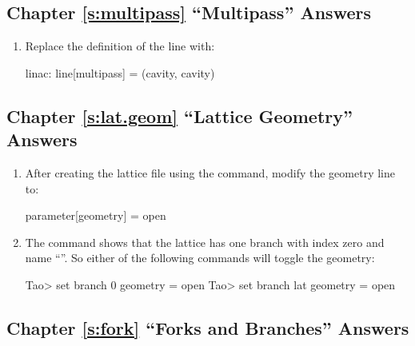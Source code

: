 \documentclass{hitec}     %
\begin{document}
\subsection[Chapter \ref*{s:multipass.ex} ``Multipass'']{Chapter \hyperref[s:multipass.ex]{\ref*{s:multipass}} ``Multipass'' Answers}
\label{s:ans.multi}

\begin{enumerate}[label=\ref*{s:multipass}.\arabic{enumi}]
\item
Replace the definition of the  line with:
\begin{code}
linac: line[multipass] = (cavity, cavity)
\end{code}
\end{enumerate}

\subsection[Chapter \ref*{s:lat.geom.ex} ``Lattice Geometry'']{Chapter \hyperref[s:lat.geom.ex]{\ref*{s:lat.geom}} ``Lattice Geometry'' Answers}
\label{s:ans.geom}

\begin{enumerate}[label=\ref*{s:lat.geom}.\arabic{enumi}]
\item
After creating the lattice file using the  command, modify the geometry line to:
\begin{code}
parameter[geometry] = open
\end{code}
%
\item
The  command shows that the lattice has one branch with index zero and name ``''. So
either of the following commands will toggle the geometry:
\begin{code}
Tao> set branch 0 geometry = open
Tao> set branch lat geometry = open
\end{code}
\end{enumerate}

\subsection[Chapter \ref*{s:fork.ex} ``Forks and Branches'']{Chapter \hyperref[s:fork.ex]{\ref*{s:fork}} ``Forks and Branches'' Answers}
\label{s:ans.fork}
\end{document}
